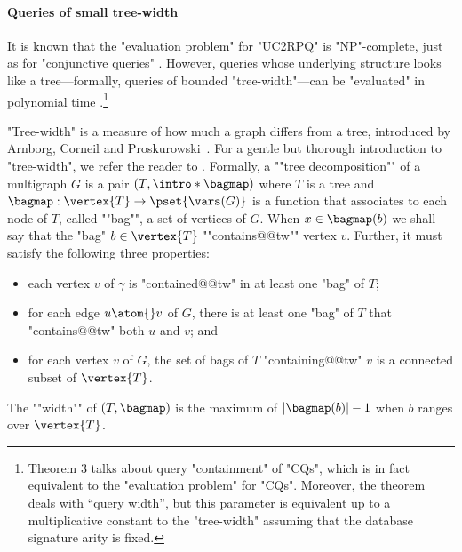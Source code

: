 \paragraph{Queries of small tree-width}
It is known that the "evaluation problem" for "UC2RPQ" is "NP"-complete, just as for "conjunctive queries"
\cite[Theorem 7]{ChandraMerlin1977Implementation}.
However, queries whose underlying structure looks like a tree---formally, queries of bounded 
"tree-width"---can be "evaluated" in polynomial time \cite[Theorem 3]{ChekuriRajaraman2000Containment}.\footnote{Theorem 3 talks about query "containment" of "CQs", which is in fact equivalent to the "evaluation problem" for "CQs". Moreover, the theorem deals with ``query width'', but this parameter is equivalent up to a multiplicative constant to the "tree-width" \cite[Lemma 2]{ChekuriRajaraman2000Containment} assuming that the database signature arity is fixed.} 

\AP
"Tree-width" is a measure of how much a
graph differs from a tree, introduced by Arnborg, Corneil and
Proskurowski~\cite{ArnborgCorneilProskurowski1987Complexity}.
%
For a gentle but thorough introduction to "tree-width", we refer the reader to
\cite[\S 3.6]{NesetrilPOM2012Prolegomena}. Formally, a \AP""tree decomposition"" of a multigraph $G$ is a
pair $(T, \intro*\bagmap)$ where $T$ is a tree and $\bagmap: \vertex{T} \to \pset{\vars(G)}$ is a function that associates to each node of $T$, called \AP""bag"",
a set of vertices of $G$. When $x \in \bagmap(b)$ we shall say that the "bag"
$b \in \vertex{T}$ \AP""contains@@tw"" vertex $v$. Further, it must satisfy the following three properties:
\begin{itemize}
    \item each vertex $v$ of $\gamma$ is "contained@@tw" in at least one "bag" of $T$;
    \item for each edge $u \atom{} v$ of $G$, there is at least one "bag" of $T$
        that "contains@@tw" both $u$ and $v$; and 
    \item for each vertex $v$ of $G$, the set of bags of $T$ "containing@@tw" $v$ is a 
        connected subset of $\vertex{T}$.
\end{itemize}
The \AP""width"" of $(T, \bagmap)$ is the maximum of $|\bagmap(b)|-1$ when $b$ ranges over
$\vertex{T}$.

